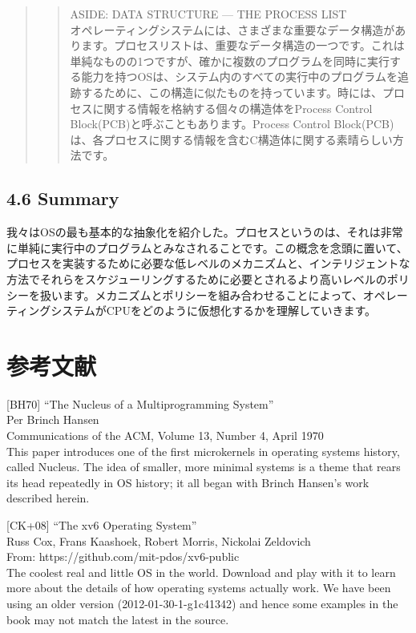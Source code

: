 \begin{quote}
\begin{quote}
ASIDE: DATA STRUCTURE --- THE PROCESS LIST\\
オペレーティングシステムには、さまざまな重要なデータ構造があります。プロセスリストは、重要なデータ構造の一つです。これは単純なものの1つですが、確かに複数のプログラムを同時に実行する能力を持つOSは、システム内のすべての実行中のプログラムを追跡するために、この構造に似たものを持っています。時には、プロセスに関する情報を格納する個々の構造体をProcess
Control Block(PCB)と呼ぶこともあります。Process Control
Block(PCB)は、各プロセスに関する情報を含むC構造体に関する素晴らしい方法です。
\end{quote}
\end{quote}

\hypertarget{summary}{%
\subsection*{4.6 Summary}\label{summary}}

我々はOSの最も基本的な抽象化を紹介した。プロセスというのは、それは非常に単純に実行中のプログラムとみなされることです。この概念を念頭に置いて、プロセスを実装するために必要な低レベルのメカニズムと、インテリジェントな方法でそれらをスケジューリングするために必要とされるより高いレベルのポリシーを扱います。メカニズムとポリシーを組み合わせることによって、オペレーティングシステムがCPUをどのように仮想化するかを理解していきます。

\hypertarget{ux53c2ux8003ux6587ux732e}{%
\section*{参考文献}\label{ux53c2ux8003ux6587ux732e}}

{[}BH70{]} ``The Nucleus of a Multiprogramming System''\\
Per Brinch Hansen\\
Communications of the ACM, Volume 13, Number 4, April 1970\\
This paper introduces one of the first microkernels in operating systems
history, called Nucleus. The idea of smaller, more minimal systems is a
theme that rears its head repeatedly in OS history; it all began with
Brinch Hansen's work described herein.

{[}CK+08{]} ``The xv6 Operating System''\\
Russ Cox, Frans Kaashoek, Robert Morris, Nickolai Zeldovich\\
From: https://github.com/mit-pdos/xv6-public\\
The coolest real and little OS in the world. Download and play with it
to learn more about the details of how operating systems actually work.
We have been using an older version (2012-01-30-1-g1c41342) and hence
some examples in the book may not match the latest in the source.

